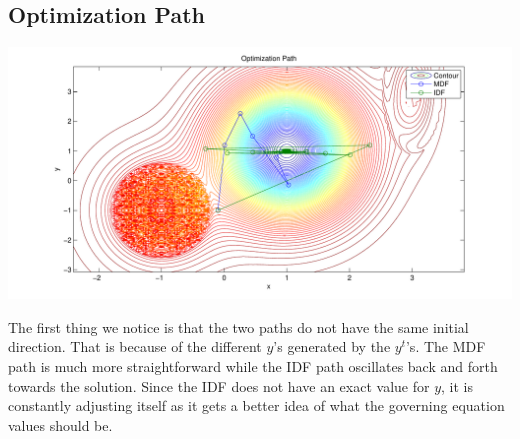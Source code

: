 \documentclass[letterpaper,12pt]{article}
\begin{document}
\subsection{Optimization Path}

\begin{center}
\includegraphics[scale=0.6]{PathComp}
\label{PathComp}
\end{center}

The first thing we notice is that the two paths do not have the same initial direction. That is because of the different $y$'s generated by the $y^t$'s. The MDF path is much more straightforward while the IDF path oscillates back and forth towards the solution. Since the IDF does not have an exact value for $y$, it is constantly adjusting itself as it gets a better idea of what the governing equation values should be.\\
\end{document}
